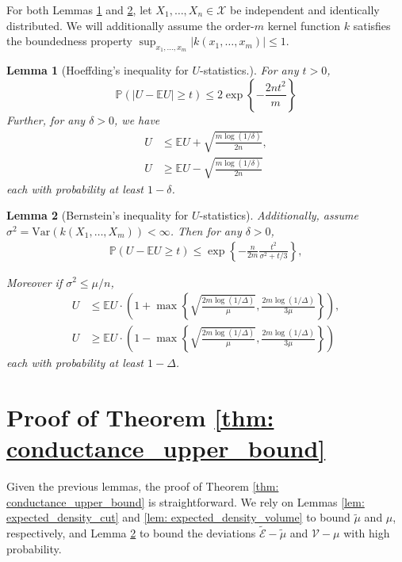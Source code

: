 \documentclass{article}
\newcommand{\abs}[1]{\left \lvert #1 \right \rvert}
\newcommand{\1}{\mathbf{1}}
\newcommand{\var}{\mathrm{Var}}
\theoremstyle{aldenthm}
\newtheorem{lemma}{Lemma}
\begin{document}
For both Lemmas \ref{lem: bounded_difference} and \ref{lem: bernstein}, let $X_1, \ldots, X_n \in \mathcal{X}$ be independent and identically distributed. We will additionally assume the order-$m$ kernel function $k$ satisfies the boundedness property $\sup_{x_1, \ldots, x_m} \abs{k(x_1, \ldots, x_m)} \leq 1$. 

\begin{lemma}[Hoeffding's inequality for $U$-statistics.]
	\label{lem: bounded_difference}
	For any $t > 0$,
	\begin{equation*}
	\mathbb{P}(\abs{U - \mathbb{E}U} \geq t) \leq 2 \exp\left\{- \frac{2nt^2}{m}\right\}
	\end{equation*}
	Further, for any $\delta > 0$, we have
	\begin{align*}
	U & \leq \mathbb{E}U + \sqrt{\frac{m \log(1 / \delta)}{2n} }, \\
	U & \geq \mathbb{E}U - \sqrt{\frac{m \log(1 / \delta)}{2n} }
	\end{align*}
	each with probability at least $1 - \delta$. 
\end{lemma}

\begin{lemma}[Bernstein's inequality for $U$-statistics]
	\label{lem: bernstein}
	Additionally, assume $\sigma^2 = \var\left(k(X_1, \ldots, X_m) \right) < \infty$. Then for any $\delta > 0$, 
	\begin{align*}
	\mathbb{P}(U - \mathbb{E}U \geq t) \leq \exp\left\{-\frac{n}{2m}\frac{t^2}{\sigma^2 + t/3}\right\},
	\end{align*}
	
	Moreover if $\sigma^2 \leq \mu/n$, 
	\begin{align*}
	U & \leq \mathbb{E}U \cdot \left(1 + \max\left\{ \sqrt{\frac{2m\log(1/\Delta)}{\mu}}, \frac{2m \log(1/\Delta)}{3\mu} \right\}\right), \\
	U & \geq \mathbb{E}U \cdot \left(1 - \max\left\{ \sqrt{\frac{2m\log(1/\Delta)}{\mu}}, \frac{2m \log(1/\Delta)}{3\mu} \right\}\right)
	\end{align*}
	each with probability at least $1 - \Delta$.
\end{lemma}

\section{Proof of Theorem \ref{thm: conductance_upper_bound}}

Given the previous lemmas, the proof of Theorem \ref{thm: conductance_upper_bound} is straightforward. We rely on Lemmas \ref{lem: expected_density_cut} and \ref{lem: expected_density_volume} to bound $\widetilde{\mu}$ and $\mu$, respectively, and Lemma \ref{lem: bernstein} to bound the deviations $\widetilde{\mathcal{E}} - \widetilde{\mu}$ and $\mathcal{V} - \mu$ with high probability.
\end{document}
